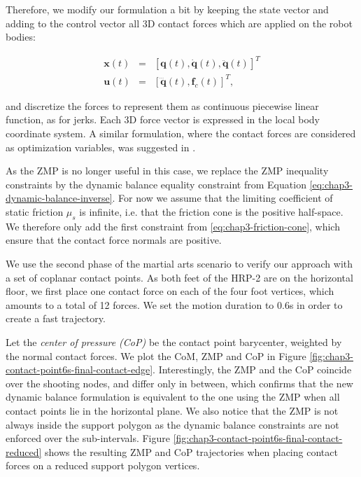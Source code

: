 Therefore, we modify our formulation a bit by keeping the state vector
and adding to the control vector all 3D contact forces which are
applied on the robot bodies:

\begin{equation}
  \begin{array}{rcl}
  \mathbf{x}(t) & = & [\mathbf{q}(t), \mathbf{\dot{q}}(t), \mathbf{\ddot{q}}(t)]^T \\
  \mathbf{u}(t) & = & [\mathbf{\dddot{q}}(t), \mathbf{f}_c(t)]^T,
  \end{array}
  \label{variables-contact-point}
\end{equation}

and discretize the forces to represent them as continuous piecewise
linear function, as for jerks. Each 3D force vector is expressed in
the local body coordinate system. A similar formulation, where the
contact forces are considered as optimization variables, was suggested
in \cite{saab-tro-12}.

As the ZMP is no longer useful in this case, we replace the ZMP
inequality constraints by the dynamic balance equality constraint from
Equation \ref{eq:chap3-dynamic-balance-inverse}. For now we assume
that the limiting coefficient of static friction $\mu_s$ is infinite,
i.e. that the friction cone is the positive half-space. We therefore
only add the first constraint from \ref{eq:chap3-friction-cone}, which
ensure that the contact force normals are positive.

We use the second phase of the martial arts scenario to verify our
approach with a set of coplanar contact points. As both feet of the
HRP-2 are on the horizontal floor, we first place one contact force on
each of the four foot vertices, which amounts to a total of 12
forces. We set the motion duration to $0.6$s in order to create a fast
trajectory.

Let the \emph{center of pressure (CoP)} be the contact point
barycenter, weighted by the normal contact forces. We plot the CoM,
ZMP and CoP in Figure
\ref{fig:chap3-contact-point6s-final-contact-edge}. Interestingly, the
ZMP and the CoP coincide over the shooting nodes, and differ only in
between, which confirms that the new dynamic balance formulation is
equivalent to the one using the ZMP when all contact points lie in the
horizontal plane. We also notice that the ZMP is not always inside the
support polygon as the dynamic balance constraints are not enforced
over the sub-intervals. Figure
\ref{fig:chap3-contact-point6s-final-contact-reduced} shows the
resulting ZMP and CoP trajectories when placing contact forces on a
reduced support polygon vertices.

